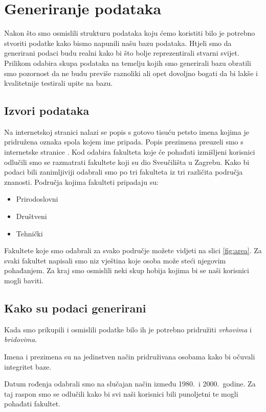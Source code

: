 \documentclass[titlepage, 12pt]{scrartcl}
\begin{document}
\section{Generiranje podataka}
Nakon što smo osmislili strukturu podataka koju ćemo koristiti bilo je potrebno stvoriti podatke kako bismo napunili našu bazu podataka. Htjeli smo da generirani podaci budu realni kako bi što bolje reprezentirali stvarni svijet. Prilikom odabira skupa podataka na temelju kojih smo generirali bazu obratili smo pozornost da ne budu previše raznoliki ali opet dovoljno bogati da bi lakše i kvalitetnije testirali upite na bazu.
\subsection{Izvori podataka}
Na internetskoj stranici \cite{imena} nalazi se popis s gotovo tisuću petsto imena kojima je pridružena oznaka spola kojem ime pripada. Popis prezimena preuzeli smo s internetske stranice \cite{prezimena}.
Kod odabira fakulteta koje će pohađati izmišljeni korisnici odlučili smo se razmatrati fakultete koji su dio Sveučilišta u Zagrebu. Kako bi podaci bili zanimljiviji odabrali smo po tri fakulteta iz tri različita područja znanosti. Područja kojima fakulteti pripadaju su:
\begin{itemize}
    \item Prirodoslovni
    \item Društveni
    \item Tehnički
\end{itemize}
Fakultete koje smo odabrali za svako područje možete vidjeti na slici \ref{fig:area}.
Za svaki fakultet napisali smo niz vještina koje osoba može steći njegovim pohađanjem.
Za kraj smo osmislili neki skup hobija kojima bi se naši korisnici mogli baviti.
\subsection{Kako su podaci generirani}
Kada smo prikupili i osmislili podatke bilo ih je potrebno pridružiti \emph{vrhovima} i \emph{bridovima}.

Imena i prezimena su na jedinstven način pridruživana osobama kako bi očuvali integritet baze.

Datum rođenja odabrali smo na slučajan način između 1980.\ i 2000.\ godine. Za taj raspon smo se odlučili kako bi svi naši korisnici bili punoljetni te mogli pohađati fakultet.
\end{document}
